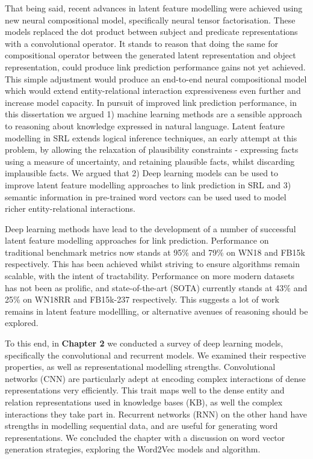\noindent That being said, recent advances in latent feature modelling were achieved using new neural compositional model, specifically neural tensor factorisation. These models replaced the dot product between subject and predicate representations with a convolutional operator. It stands to reason that doing the same for compositional operator between the generated latent representation and object representation, could produce link prediction performance gains not yet achieved. This simple adjustment would produce an end-to-end neural compositional model which would extend entity-relational interaction expressiveness even further and increase model capacity. In pursuit of improved link prediction performance, in this dissertation we argued 1) machine learning methods are a sensible approach to reasoning about knowledge expressed in natural language. Latent feature modelling in SRL extends logical inference techniques, an early attempt at this problem, by allowing the relaxation of plausibility constraints - expressing facts using a measure of uncertainty, and retaining plausible facts, whilst discarding implausible facts. We argued that 2) Deep learning models can be used to improve latent feature modelling approaches to link prediction in SRL and 3) semantic information in pre-trained word vectors can be used used to model richer entity-relational interactions. \par

\noindent Deep learning methods have lead to the development of a number of successful latent feature modelling approaches for link prediction. Performance on traditional benchmark metrics now stands at 95\% and 79\% on WN18 and FB15k respectively. This has been achieved whilst striving to ensure algorithms remain scalable, with the intent of tractability. Performance on more modern datasets has not been as prolific, and state-of-the-art (SOTA) currently stands at 43\% and 25\% on WN18RR and FB15k-237 respectively. This suggests a lot of work remains in latent feature modellling, or alternative avenues of reasoning should be explored. \par

\noindent To this end, in \textbf{Chapter 2} we conducted a survey of deep learning models, specifically the convolutional and recurrent models. We examined their respective properties, as well as representational modelling strengths. Convolutional networks (CNN) are particularly adept at encoding complex interactions of dense representations very efficiently. This trait maps well to the dense entity and relation representations used in knowledge bases (KB), as well the complex interactions they take part in. Recurrent networks (RNN) on the other hand have strengths in modelling sequential data, and are useful for generating word representations. We concluded the chapter with a discussion on word vector generation strategies, exploring the Word2Vec models and algorithm. \par

